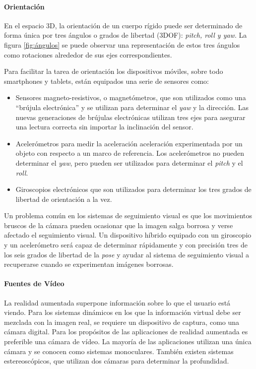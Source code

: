 \paragraph{Orientación}
En el espacio 3D, la orientación de un cuerpo rígido puede ser determinado de forma única por tres ángulos o grados de libertad (3DOF): \emph{pitch, roll y yaw}. La figura \ref{fig:ángulos}  se puede observar una representación de estos tres ángulos como rotaciones alrededor de sus ejes correspondientes. 

Para facilitar la tarea de orientación los dispositivos móviles, sobre todo smartphones y tablets, están equipados una serie de sensores como:
\begin{itemize}
\item Sensores magneto-resistivos, o magnetómetros, que son utilizados como una ``brújula electrónica'' y se utilizan para determinar el \emph{yaw} y la dirección. Las nuevas generaciones de brújulas electrónicas utilizan tres ejes para asegurar una lectura correcta sin importar la inclinación del sensor.
 
\item Acelerómetros para medir la aceleración aceleración experimentada por un objeto con respecto a un marco de referencia. Los acelerómetros no pueden determinar el \emph{yaw}, pero pueden ser utilizados para determinar el \emph{pitch} y el \emph{roll}. 
\item Giroscopios electrónicos que son utilizados para determinar los tres grados de libertad de orientación a la vez.
\end{itemize}

Un problema común en los sistemas de seguimiento visual es que los movimientos bruscos de la cámara pueden ocasionar que la imagen salga borrosa y verse afectado el seguimiento visual. Un dispositivo híbrido equipado con un giroscopio y un acelerómetro será capaz de determinar rápidamente y con precisión tres de los seis grados de libertad de la \emph{pose} y ayudar al sistema de seguimiento visual a recuperarse cuando se experimentan imágenes borrosas. 

\paragraph{Fuentes de Vídeo}
La realidad aumentada superpone información sobre lo que el usuario está viendo. Para los sistemas dinámicos en los que la información virtual debe ser mezclada con la imagen real, se requiere un dispositivo de captura, como una cámara digital. Para los propósitos de las aplicaciones de realidad aumentada es preferible una cámara de vídeo. La mayoría de las aplicaciones utilizan una única cámara y se conocen como sistemas monoculares. También existen sistemas estereoscópicos, que  utilizan dos cámaras para determinar la profundidad.

